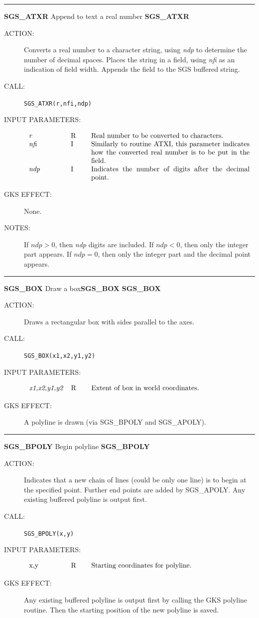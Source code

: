 \documentclass[11pt]{article}
\newcommand{\htmlref}[2]{#1}
\newcommand{\xlabel}[1]{}
\newcommand{\rthead}[2]{\rule{\textwidth}{0.3mm}
{\Large {\bf #1} \hfill #2 \hfill {\bf #1}}}
\newenvironment{params}%
{\[\begin{tabular}{p{0.14\textwidth}p{0.05\textwidth}p{0.66\textwidth}}}%
{\end{tabular}\]}
\newcommand{\rparams}[3]{{\em #1} &#2 &#3\\}
\newcommand{\rthead}[2]{\subsection{\label{#1}\xlabel{#1}#1 - #2}}
\newenvironment{params}{\begin{description}}{\end{description}}
\newcommand{\rparams}[3]{\item{{\em #1}} (#2) #3}
\begin{document}
\rthead{SGS\_ATXR}{Append to text a real number}
\begin{description}
\item [ACTION:]
Converts a real number to a character string, using {\em ndp}\/ to determine the
number of decimal spaces.
Places the string in a field, using {\em nfi}\/ as an indication of field width.
Appends the field to the SGS buffered string.
\item [CALL:]
{\tt SGS\_ATXR(r,nfi,ndp)}
\item [INPUT PARAMETERS:]
\begin{params}
\rparams{r}{R}{Real number to be converted to characters.}
\rparams{nfi}{I}{Similarly to routine ATXI, this parameter indicates how the
converted real number is to be put in the field.}
\rparams{ndp}{I}{Indicates the number of digits after the decimal point.}
\end{params}
\item [GKS EFFECT:]
None.
\item [NOTES:]
If $\mathit{ndp}>0$, then {\it ndp}\/ digits are included.
If $\mathit{ndp}<0$, then only the integer part appears.
If $\mathit{ndp}=0$, then only the integer part and the decimal point appears.
\end{description}
\goodbreak

\rthead{SGS\_BOX}{Draw a box\hfill {\bf SGS\_BOX}}
\begin{description}
\item [ACTION:]
Draws a rectangular box with sides parallel to the axes.
\item [CALL:]
{\tt SGS\_BOX(x1,x2,y1,y2)}
\item [INPUT PARAMETERS:]
\begin{params}
\rparams{x1,x2,y1,y2}{R}{Extent of box in world coordinates.}
\end{params}
\item [GKS EFFECT:]
A polyline is drawn (via \htmlref{SGS\_BPOLY}{SGS_BPOLY} and
\htmlref{SGS\_APOLY}{SGS_APOLY}).
\end{description}
\goodbreak

\rthead{SGS\_BPOLY}{Begin polyline}
\begin{description}
\item [ACTION:]
Indicates that a new chain of lines (could be only one line) is to begin at the
specified point.
Further end points are added by \htmlref{SGS\_APOLY}{SGS_APOLY}.
Any existing buffered polyline is output first.
\item [CALL:]
{\tt SGS\_BPOLY(x,y)}
\item [INPUT PARAMETERS:]
\begin{params}
\rparams{\em x,y}{R}{Starting coordinates for polyline.}
\end{params}
\item [GKS EFFECT:]
Any existing buffered polyline is output first by calling the GKS polyline
routine.
Then the starting position of the new polyline is saved.
\end{description}
\goodbreak
\end{document}
